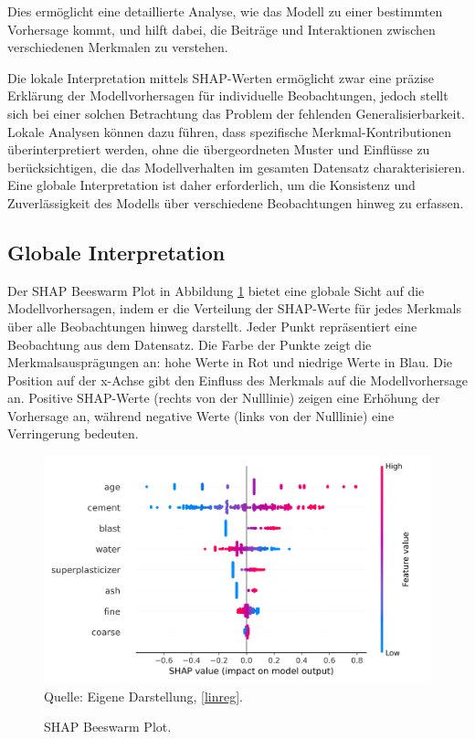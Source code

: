 Dies ermöglicht eine detaillierte Analyse, wie das Modell zu einer bestimmten Vorhersage kommt, 
und hilft dabei, die Beiträge und Interaktionen zwischen verschiedenen Merkmalen zu verstehen.

Die lokale Interpretation mittels SHAP-Werten ermöglicht zwar eine präzise Erklärung 
der Modellvorhersagen für individuelle Beobachtungen, jedoch stellt sich bei einer 
solchen Betrachtung das Problem der fehlenden Generalisierbarkeit. 
Lokale Analysen können dazu führen, dass spezifische Merkmal-Kontributionen überinterpretiert werden, 
ohne die übergeordneten Muster und Einflüsse zu berücksichtigen, 
die das Modellverhalten im gesamten Datensatz charakterisieren. 
Eine globale Interpretation ist daher erforderlich, um die Konsistenz und Zuverlässigkeit 
des Modells über verschiedene Beobachtungen hinweg zu erfassen. 

\subsection{Globale Interpretation}

Der SHAP Beeswarm Plot in Abbildung \ref{pic:shap_beeswarm} bietet eine globale 
Sicht auf die Modellvorhersagen, indem er die Verteilung der SHAP-Werte für jedes Merkmals 
über alle Beobachtungen hinweg darstellt. Jeder Punkt repräsentiert eine Beobachtung aus dem Datensatz.
Die Farbe der Punkte zeigt die Merkmalsausprägungen an: hohe Werte in Rot und niedrige Werte in Blau. 
Die Position auf der x-Achse gibt den Einfluss des Merkmals auf die Modellvorhersage an. 
Positive SHAP-Werte (rechts von der Nulllinie) zeigen eine Erhöhung der Vorhersage an, 
während negative Werte (links von der Nulllinie) eine Verringerung bedeuten. 

\begin{figure}[!h]
    \caption{SHAP Beeswarm Plot.}
    \includegraphics[width=1\textwidth]{../scripts/images/shap_beeswarm_plot.png}
    Quelle: Eigene Darstellung, \ref{linreg}.
    \label{pic:shap_beeswarm}
\end{figure}


